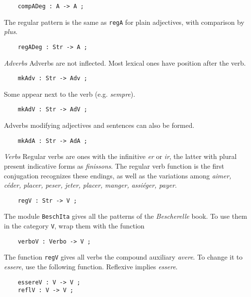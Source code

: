 \documentclass[11pt,a4paper]{article}
\newcommand{\subsubsubsection}[1]{\textit{#1}}
\begin{document}
\begin{verbatim}
    compADeg : A -> A ;
\end{verbatim}

The regular pattern is the same as \texttt{regA} for plain adjectives, 
with comparison by \textit{plus}.

\begin{verbatim}
    regADeg : Str -> A ;
\end{verbatim}

\subsubsubsection{Adverbs}
Adverbs are not inflected. Most lexical ones have position
after the verb. 

\begin{verbatim}
    mkAdv : Str -> Adv ;
\end{verbatim}

Some appear next to the verb (e.g. \textit{sempre}).

\begin{verbatim}
    mkAdV : Str -> AdV ;
\end{verbatim}

Adverbs modifying adjectives and sentences can also be formed.

\begin{verbatim}
    mkAdA : Str -> AdA ;
\end{verbatim}

\subsubsubsection{Verbs}
Regular verbs are ones with the infinitive \textit{er} or \textit{ir}, the
latter with plural present indicative forms as \textit{finissons}.
The regular verb function is the first conjugation recognizes
these endings, as well as the variations among
\textit{aimer, céder, placer, peser, jeter, placer, manger, assiéger, payer}.

\begin{verbatim}
    regV : Str -> V ;
\end{verbatim}

The module \texttt{BeschIta} gives all the patterns of the \textit{Bescherelle}
book. To use them in the category \texttt{V}, wrap them with the function

\begin{verbatim}
    verboV : Verbo -> V ;
\end{verbatim}

The function \texttt{regV} gives all verbs the compound auxiliary \textit{avere}.
To change it to \textit{essere}, use the following function.
Reflexive implies \textit{essere}.

\begin{verbatim}
    essereV : V -> V ;
    reflV : V -> V ;
\end{verbatim}
\end{document}
